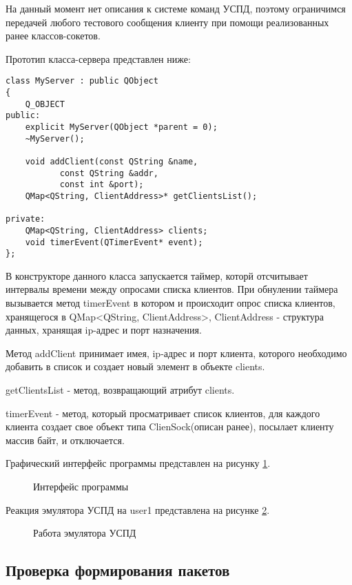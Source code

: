 На данный момент нет описания к системе команд УСПД, поэтому ограничимся передачей любого тестового сообщения клиенту при помощи реализованных ранее классов-сокетов.

Прототип класса-сервера представлен ниже:

\begin{lstlisting}
class MyServer : public QObject
{
    Q_OBJECT
public:
    explicit MyServer(QObject *parent = 0);
    ~MyServer();

    void addClient(const QString &name, 
		   const QString &addr, 
		   const int &port);
    QMap<QString, ClientAddress>* getClientsList();

private:
    QMap<QString, ClientAddress> clients;
    void timerEvent(QTimerEvent* event);
};
\end{lstlisting}

В конструкторе данного класса запускается таймер, которй отсчитывает интервалы времени между опросами списка клиентов. При обнулении таймера вызывается метод timerEvent в котором и происходит опрос списка клиентов, хранящегося в QMap<QString, ClientAddress>, ClientAddress - структура данных, хранящая ip-адрес и порт назначения.

Метод addClient принимает имея, ip-адрес и порт клиента, которого необходимо добавить в список и создает новый элемент в объекте clients.

getClientsList - метод, возвращающий атрибут clients.

timerEvent - метод, который просматривает список клиентов, для каждого клиента создает свое объект типа ClienSock(описан ранее), посылает клиенту массив байт, и отключается. 

Графический интерфейс программы представлен на рисунку \ref{server_gui:server_gui}.

\begin{figure}[ht!]
 \caption{Интерфейс программы}
 \label{server_gui:server_gui}
\end{figure}

Реакция эмулятора УСПД на user1 представлена на рисунке \ref{client_log:client_log}.

\begin{figure}[ht!]
 \caption{Работа эмулятора УСПД}
 \label{client_log:client_log}
\end{figure}

\subsection{Проверка формирования пакетов}

